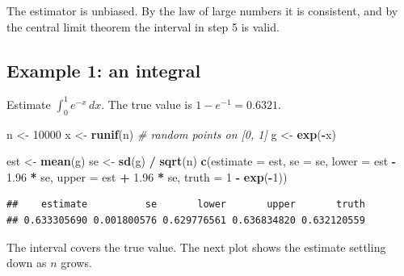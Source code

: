 \documentclass[
]{article}
\newenvironment{Shaded}{\begin{snugshade}}{\end{snugshade}}
\newcommand{\AttributeTok}[1]{\textcolor[rgb]{0.13,0.29,0.53}{#1}}
\newcommand{\CommentTok}[1]{\textcolor[rgb]{0.56,0.35,0.01}{\textit{#1}}}
\newcommand{\DecValTok}[1]{\textcolor[rgb]{0.00,0.00,0.81}{#1}}
\newcommand{\FloatTok}[1]{\textcolor[rgb]{0.00,0.00,0.81}{#1}}
\newcommand{\FunctionTok}[1]{\textcolor[rgb]{0.13,0.29,0.53}{\textbf{#1}}}
\newcommand{\NormalTok}[1]{#1}
\newcommand{\OtherTok}[1]{\textcolor[rgb]{0.56,0.35,0.01}{#1}}
\newcommand{\SpecialCharTok}[1]{\textcolor[rgb]{0.81,0.36,0.00}{\textbf{#1}}}
\begin{document}
The estimator is unbiased. By the law of large numbers it is consistent,
and by the central limit theorem the interval in step 5 is valid.

\subsection{Example 1: an integral}\label{example-1-an-integral}

Estimate \(\int_0^1 e^{-x}\,dx\). The true value is
\(1-e^{-1} = 0.6321\).

\begin{Shaded}
\begin{Highlighting}[]
\NormalTok{n }\OtherTok{\textless{}{-}} \DecValTok{10000}
\NormalTok{x }\OtherTok{\textless{}{-}} \FunctionTok{runif}\NormalTok{(n)                 }\CommentTok{\# random points on [0, 1]}
\NormalTok{g }\OtherTok{\textless{}{-}} \FunctionTok{exp}\NormalTok{(}\SpecialCharTok{{-}}\NormalTok{x)}

\NormalTok{est }\OtherTok{\textless{}{-}} \FunctionTok{mean}\NormalTok{(g)}
\NormalTok{se  }\OtherTok{\textless{}{-}} \FunctionTok{sd}\NormalTok{(g) }\SpecialCharTok{/} \FunctionTok{sqrt}\NormalTok{(n)}
\FunctionTok{c}\NormalTok{(}\AttributeTok{estimate =}\NormalTok{ est, }\AttributeTok{se =}\NormalTok{ se, }\AttributeTok{lower =}\NormalTok{ est }\SpecialCharTok{{-}} \FloatTok{1.96} \SpecialCharTok{*}\NormalTok{ se, }\AttributeTok{upper =}\NormalTok{ est }\SpecialCharTok{+} \FloatTok{1.96} \SpecialCharTok{*}\NormalTok{ se,}
  \AttributeTok{truth =} \DecValTok{1} \SpecialCharTok{{-}} \FunctionTok{exp}\NormalTok{(}\SpecialCharTok{{-}}\DecValTok{1}\NormalTok{))}
\end{Highlighting}
\end{Shaded}

\begin{verbatim}
##    estimate          se       lower       upper       truth 
## 0.633305690 0.001800576 0.629776561 0.636834820 0.632120559
\end{verbatim}

The interval covers the true value. The next plot shows the estimate
settling down as \(n\) grows.
\end{document}

